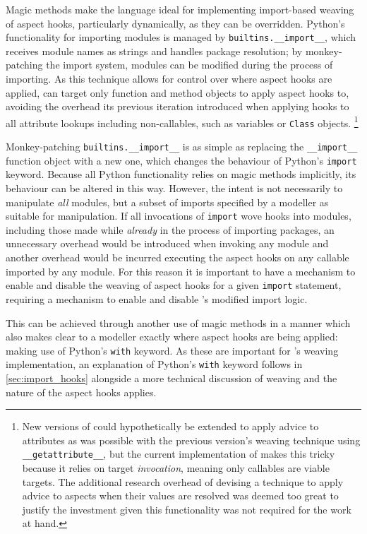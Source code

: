 Magic methods make the language ideal for implementing import-based weaving of
aspect hooks, particularly dynamically, as they can be overridden. Python's
functionality for importing modules is managed by
\lstinline{builtins.__import__}, which receives module names as strings and
handles package resolution; by monkey-patching the import system, modules can be
modified during the process of importing. As this technique allows for control
over where aspect hooks are applied, \pdsf can target only function and method
objects to apply aspect hooks to, avoiding the overhead its previous iteration
introduced when applying hooks to all attribute lookups including non-callables,
such as variables or \lstinline{Class} objects.
\footnote{
New versions of \pdsf{} could hypothetically be extended to apply advice to
attributes as was possible with the previous version's weaving technique using
\lstinline{__getattribute__}, but the current implementation of \pdsf{} makes
this tricky because it relies on target \emph{invocation}, meaning only
callables are viable targets. The additional research overhead of devising a
technique to apply advice to aspects when their values are resolved was deemed
too great to justify the investment given this functionality was not required
for the work at hand.
}

Monkey-patching \lstinline{builtins.__import__} is as simple as replacing the
\lstinline{__import__} function object with a new one, which changes the
behaviour of Python's \lstinline{import} keyword. Because all Python
functionality relies on magic methods implicitly, its behaviour can be altered
in this way. However, the intent is not necessarily to manipulate \emph{all}
modules, but a subset of imports specified by a modeller as suitable for
manipulation. If all invocations of \lstinline{import} wove hooks into modules,
including those made while \emph{already} in the process of importing packages,
an unnecessary overhead would be introduced when invoking any module and another
overhead would be incurred executing the aspect hooks on any callable imported
by any module. For this reason it is important to have a mechanism to enable and
disable the weaving of aspect hooks for a given \lstinline{import} statement,
requiring a mechanism to enable and disable \pdsf{}'s modified import logic.

This can be achieved through another use of magic methods in a manner which also
makes clear to a modeller exactly where aspect hooks are being applied: making
use of Python's \lstinline{with} keyword. As these are important for \pdsf{}'s
weaving implementation, an explanation of Python's \lstinline{with} keyword
follows in \cref{sec:import_hooks} alongside a more technical discussion of
weaving and the nature of the aspect hooks \pdsf{} applies.



